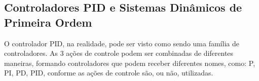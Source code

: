 
\subsection{Controladores PID e Sistemas Dinâmicos de Primeira Ordem}

\hspace{4ex}O controlador PID, na realidade, pode ser visto como sendo uma família de controladores. As 3 ações de controle podem ser combinadas de diferentes maneiras, formando controladores que podem receber diferentes nomes, como: P, PI, PD, PID, conforme as ações de controle são, ou não, utilizadas.

